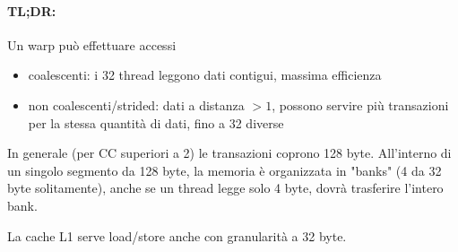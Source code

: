 \paragraph{TL;DR:} Un warp può effettuare accessi
\begin{itemize}
	\item coalescenti: i 32 thread leggono dati contigui, massima efficienza
	\item non coalescenti/strided: dati a distanza $>1$, possono servire più transazioni per la stessa quantità di dati, fino a 32 diverse
\end{itemize}

In generale (per CC superiori a 2) le transazioni coprono 128 byte. All'interno di un singolo segmento da 128 byte, la memoria è organizzata in "banks" (4 da 32 byte solitamente), anche se un thread legge solo 4 byte, dovrà trasferire l'intero bank.

La cache L1 serve load/store anche con granularità a 32 byte.